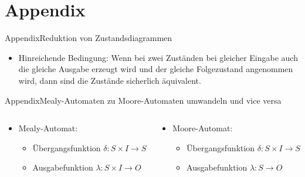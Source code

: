 
\section{Appendix}

\setcounter{exercise}{1}

\begin{frame}{Appendix}{Reduktion von Zustandsdiagrammen}
  \begin{itemize}
    \item \alert{Hinreichende Bedingung:} Wenn bei zwei Zuständen bei gleicher Eingabe auch die gleiche Ausgabe erzeugt wird und der gleiche Folgezustand angenommen wird, dann sind die Zustände sicherlich äquivalent.
  \end{itemize}
\end{frame}

\begin{frame}{Appendix}{Mealy-Automaten zu Moore-Automaten umwandeln und vice versa}
  \begin{columns}
    \begin{column}{0.45\textwidth}
      \begin{itemize}
        \item \alert{Mealy-Automat:}
        \begin{itemize}
          \item \alert{Übergangsfunktion} $\delta: S \times I \rightarrow S$
          \item \alert{Ausgabefunktion} $\lambda: S \times I \rightarrow O$
        \end{itemize}
      \end{itemize}
    \end{column}
    \begin{column}{0.55\textwidth}
      \begin{itemize}
        \item \alert{Moore-Automat:}
        \begin{itemize}
          \item \alert{Übergangsfunktion} $\delta: S \times I \rightarrow S$
          \item \alert{Ausgabefunktion} $\lambda: S \rightarrow O$
        \end{itemize}
      \end{itemize}
    \end{column}
  \end{columns}
\end{frame}

